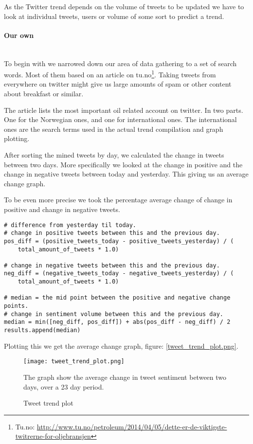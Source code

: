 As the Twitter trend depends on the volume of tweets to be updated we have to
look at individual tweets, users or volume of some sort to predict a trend. 
%

\paragraph{Our own}
\hspace{0pt}\\
To begin with we narrowed down our area of data gathering to a set of search
words. Most of them based on an article on tu.no\footnote{Tu.no:
\url{http://www.tu.no/petroleum/2014/04/05/dette-er-de-viktigste-twitrerne-for-oljebransjen}}.
Taking tweets from everywhere on twitter might give us large amounts of spam or
other content about breakfast or similar. 

The article lists the most important oil related account on twitter. In two
parts. One for the Norwegian ones, and one for international ones. The
international ones are the search terms used in the actual trend compilation
and graph plotting. 

After sorting the mined tweets by day, we calculated the change in tweets
between two days. More specifically we looked at the change in positive and the
change in negative tweets between today and yesterday. This giving us an
average change graph.

To be even more precise we took the percentage average change of change in
positive and change in negative tweets. 
\begin{verbatim}
# difference from yesterday til today.
# change in positive tweets between this and the previous day.
pos_diff = (positive_tweets_today - positive_tweets_yesterday) / (
    total_amount_of_tweets * 1.0)

# change in negative tweets between this and the previous day.
neg_diff = (negative_tweets_today - negative_tweets_yesterday) / (
    total_amount_of_tweets * 1.0)

# median = the mid point between the positive and negative change points.
# change in sentiment volume between this and the previous day.
median = min([neg_diff, pos_diff]) + abs(pos_diff - neg_diff) / 2
results.append(median)
\end{verbatim}
Plotting this we get the average change graph, figure: \ref{tweet_trend_plot.png}.

\begin{figure}[htb]
    \centering
    \texttt{[image: tweet\_trend\_plot.png]}
    \label{fig:trend_tweet_plot}
    \caption{Tweet trend plot}
The graph show the average change in tweet sentiment between two days, over a 23 day period. 
\end{figure}
% 

